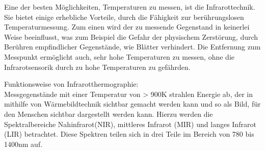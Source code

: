 Eine der besten Möglichkeiten, Temperaturen zu messen, ist die Infrarottechnik.
Sie bietet einige erhebliche Vorteile, durch die Fähigkeit zur berührungslosen
Temperaturmessung. Zum einen wird der zu messende Gegenstand in keinerlei Weise
beeinflusst, was zum Beispiel die Gefahr der physischem Zerstörung, durch
Berühren empfindlicher Gegenstände, wie Blätter verhindert. Die
Entfernung zum Messpunkt ermöglicht auch, sehr hohe Temperaturen zu messen,
ohne die Infrarotsensorik durch zu hohe Temperaturen zu gefährden.

Funktionsweise von Infrarotthermographie: \\
Messgegenstände mit einer Temperatur von > 900K strahlen Energie ab, der in mithilfe von Wärmebildtechnik sichtbar gemacht werden kann und so als Bild, für den Menschen sichtbar dargestellt werden kann.
Hierzu werden die Spektralbereiche Nahinfrarot(NIR), mittleres Infrarot (MIR) und langes Infrarot (LIR) betrachtet. 
Diese Spektren teilen sich in drei Teile im Bereich von 780 bis 1400nm auf.\cite{schuster2004infrarotthermographie}
